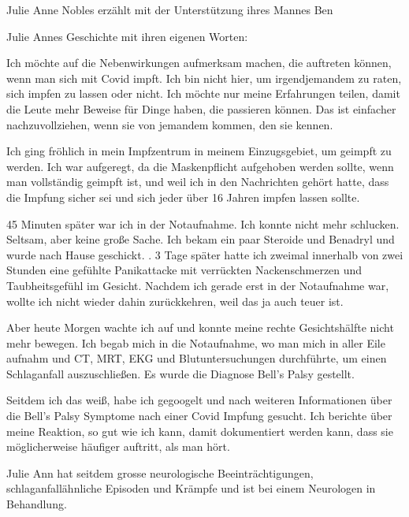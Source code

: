 Julie Anne Nobles erzählt mit der Unterstützung ihres Mannes Ben

Julie Annes Geschichte mit ihren eigenen Worten:

Ich möchte auf die Nebenwirkungen aufmerksam machen, die auftreten können, wenn
man sich mit Covid impft. Ich bin nicht hier, um irgendjemandem zu raten, sich
impfen zu lassen oder nicht. Ich möchte nur meine Erfahrungen teilen, damit die
Leute mehr Beweise für Dinge haben, die passieren können. Das ist einfacher
nachzuvollziehen, wenn sie von jemandem kommen, den sie kennen.

Ich ging fröhlich in mein Impfzentrum in meinem Einzugsgebiet, um geimpft zu
werden. Ich war aufgeregt, da die Maskenpflicht aufgehoben werden sollte, wenn
man vollständig geimpft ist, und weil ich in den Nachrichten gehört hatte, dass
die Impfung sicher sei und sich jeder über 16 Jahren impfen lassen sollte.

45 Minuten später war ich in der Notaufnahme. Ich konnte nicht mehr
schlucken. Seltsam, aber keine große Sache. Ich bekam ein paar Steroide und
Benadryl und wurde nach Hause geschickt.  .  3 Tage später hatte ich zweimal
innerhalb von zwei Stunden eine gefühlte Panikattacke mit verrückten
Nackenschmerzen und Taubheitsgefühl im Gesicht. Nachdem ich gerade erst in der
Notaufnahme war, wollte ich nicht wieder dahin zurückkehren, weil das ja auch
teuer ist.

Aber heute Morgen wachte ich auf und konnte meine rechte Gesichtshälfte nicht
mehr bewegen. Ich begab mich in die Notaufnahme, wo man mich in aller Eile
aufnahm und CT, MRT, EKG und Blutuntersuchungen durchführte, um einen
Schlaganfall auszuschließen. Es wurde die Diagnose Bell's Palsy gestellt.

Seitdem ich das weiß, habe ich gegoogelt und nach weiteren Informationen über
die Bell's Palsy Symptome nach einer Covid Impfung gesucht. Ich berichte über
meine Reaktion, so gut wie ich kann, damit dokumentiert werden kann, dass sie
möglicherweise häufiger auftritt, als man hört.

Julie Ann hat seitdem grosse neurologische Beeinträchtigungen,
schlaganfallähnliche Episoden und Krämpfe und ist bei einem Neurologen in
Behandlung.
